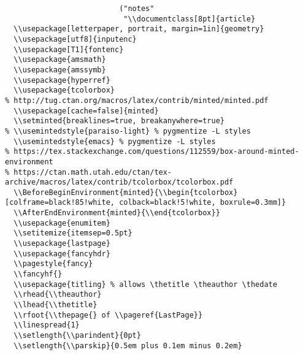 \documentclass[8pt]{article}
\begin{document}
\begin{verbatim}
                          ("notes"
                           "\\documentclass[8pt]{article}
  \\usepackage[letterpaper, portrait, margin=1in]{geometry}
  \\usepackage[utf8]{inputenc}
  \\usepackage[T1]{fontenc}
  \\usepackage{amsmath}
  \\usepackage{amssymb}
  \\usepackage{hyperref}
  \\usepackage{tcolorbox}
% http://tug.ctan.org/macros/latex/contrib/minted/minted.pdf
  \\usepackage[cache=false]{minted}
  \\setminted{breaklines=true, breakanywhere=true}
% \\usemintedstyle{paraiso-light} % pygmentize -L styles
  \\usemintedstyle{emacs} % pygmentize -L styles
% https://tex.stackexchange.com/questions/112559/box-around-minted-environment
% https://ctan.math.utah.edu/ctan/tex-archive/macros/latex/contrib/tcolorbox/tcolorbox.pdf
  \\BeforeBeginEnvironment{minted}{\\begin{tcolorbox}[colframe=black!85!white, colback=black!5!white, boxrule=0.3mm]}
  \\AfterEndEnvironment{minted}{\\end{tcolorbox}}
  \\usepackage{enumitem}
  \\setitemize{itemsep=0.5pt}
  \\usepackage{lastpage}
  \\usepackage{fancyhdr}
  \\pagestyle{fancy}
  \\fancyhf{}
  \\usepackage{titling} % allows \thetitle \theauthor \thedate
  \\rhead{\\theauthor}
  \\lhead{\\thetitle}
  \\rfoot{\\thepage{} of \\pageref{LastPage}}
  \\linespread{1}
  \\setlength{\\parindent}{0pt}
  \\setlength{\\parskip}{0.5em plus 0.1em minus 0.2em}

\end{verbatim}
\end{document}
